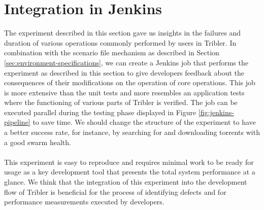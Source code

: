 \section{Integration in Jenkins}
The experiment described in this section gave us insights in the failures and duration of various operations commonly performed by users in Tribler. In combination with the scenario file mechanism as described in Section \ref{sec:environment-specifications}, we can create a Jenkins job that performs the experiment as described in this section to give developers feedback about the consequences of their modifications on the operation of core operations. This job is more extensive than the unit tests and more resembles an application tests where the functioning of various parts of Tribler is verified. The job can be executed parallel during the testing phase displayed in Figure \ref{fig:jenkins-pipeline} to save time. We should change the structure of the experiment to have a better success rate, for instance, by searching for and downloading torrents with a good swarm health.\\\\
This experiment is easy to reproduce and requires minimal work to be ready for usage as a key development tool that presents the total system performance at a glance. We think that the integration of this experiment into the development flow of Tribler is beneficial for the process of identifying defects and for performance measurements executed by developers.
